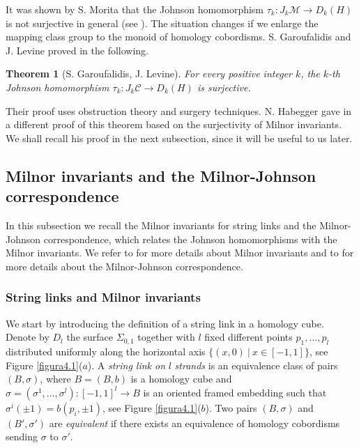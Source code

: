 \documentclass[10pt]{amsart}
\numberwithin{equation}{section}
\numberwithin{equation}{section}
\newtheorem{theorem}{Theorem}[section]
\theoremstyle{definition}
\begin{document}
It was shown by S. Morita that  the Johnson homomorphism $\tau_k:J_k\mathcal{M}\rightarrow D_k(H)$ is not surjective in general  (see \cite[Section 6]{MR1224104}). The situation changes if we enlarge the mapping class group to the monoid of homology cobordisms. 
S. Garoufalidis and J. Levine proved in \cite[Theorem 3, Proposition 2.5]{MR2131016} the following.

\begin{theorem}[S. Garoufalidis, J. Levine]\label{thmgl} For every positive integer $k$, the $k$-th Johnson homomorphism $\tau_k:J_k\mathcal{C}\rightarrow D_k(H)$ is surjective.
\end{theorem}

Their proof uses obstruction theory and surgery techniques. N. Habegger gave in \cite{habegger2000milnor} a different proof of this theorem based on the surjectivity of Milnor invariants. We shall recall his proof in the next subsection, since it will be useful to us later.

\subsection{Milnor invariants and the Milnor-Johnson correspondence}\label{MJcorrespondence}
In this subsection we recall the Milnor invariants for string links and the Milnor-Johnson correspondence, which  relates the Johnson homomorphisms with the Milnor invariants. We refer to \cite{MR1026062,MR1620841}  for more details about Milnor invariants and to \cite{habegger2000milnor,MR2403806} for  more details about the Milnor-Johnson correspondence.

\subsubsection{String links and Milnor invariants}
 We start by introducing the definition of a string link in a homology cube. Denote by $D_l$ the surface $\Sigma_{0,1}$ together with  $l$ fixed  different points $p_1,\ldots,p_l$   distributed uniformly along the horizontal axis $\{(x,0)\ |\ x\in[-1,1]\}$, see Figure \ref{figura4.1}($a$). A \emph{string link on} $l$ \emph{strands} is an equivalence class of  pairs $(B,\sigma)$, where $B=(B,b)$  is a homology cube and $\sigma=(\sigma^{1},\ldots,\sigma^l):[-1,1]^l\rightarrow B$ is an oriented framed embedding such that $\sigma^i(\pm 1)=b(p_i,\pm 1)$, see Figure \ref{figura4.1}($b$).  Two pairs $(B,\sigma)$ and $(B',\sigma')$ are \emph{equivalent} if there exists an equivalence of homology cobordisms sending $\sigma$ to $\sigma'$.
\end{document}
